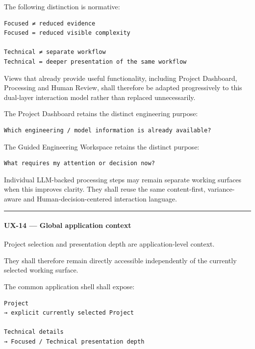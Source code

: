 The following distinction is normative:

\begin{verbatim}
Focused ≠ reduced evidence
Focused = reduced visible complexity

Technical ≠ separate workflow
Technical = deeper presentation of the same workflow
\end{verbatim}

Views that already provide useful functionality, including Project Dashboard, Processing and Human Review, shall therefore be adapted progressively to this dual-layer interaction model rather than replaced unnecessarily.

The Project Dashboard retains the distinct engineering purpose:

\begin{verbatim}
Which engineering / model information is already available?
\end{verbatim}

The Guided Engineering Workspace retains the distinct purpose:

\begin{verbatim}
What requires my attention or decision now?
\end{verbatim}

Individual LLM-backed processing steps may remain separate working surfaces when this improves clarity. They shall reuse the same content-first, variance-aware and Human-decision-centered interaction language.

\begin{center}\rule{0.5\linewidth}{0.5pt}\end{center}

\hypertarget{ux-14--global-application-context}{%
\paragraph{UX-14 --- Global application context}\label{ux-14--global-application-context}}

Project selection and presentation depth are application-level context.

They shall therefore remain directly accessible independently of the currently selected working surface.

The common application shell shall expose:

\begin{verbatim}
Project
→ explicit currently selected Project

Technical details
→ Focused / Technical presentation depth
\end{verbatim}

